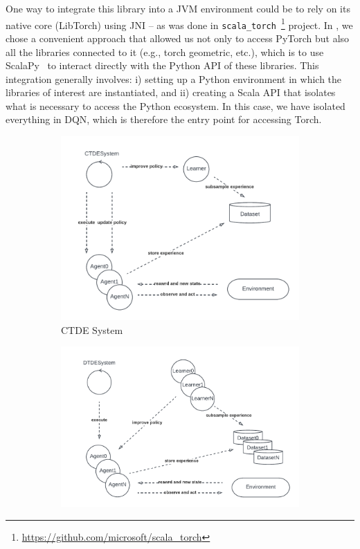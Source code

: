%
One way to integrate this library into a JVM environment could be 
 to rely on its native core (LibTorch) using JNI -- 
 as was done in \texttt{scala\_torch}~\footnote{\url{https://github.com/microsoft/scala_torch}} project. 
 In \scarlib{}, we chose a convenient approach 
 that allowed us not only to access PyTorch 
 but also all the libraries connected to it 
 (e.g., torch geometric, etc.), 
 which is to use ScalaPy~\cite{Laddad2020}  to interact directly with the Python API 
 of these libraries.
%
This integration generally involves:
i) setting up a Python environment in which the libraries of interest are instantiated, and
ii) creating a Scala API that isolates what is necessary to access the Python ecosystem.
In this case, we have isolated everything in DQN, which is therefore the entry point for accessing Torch.
\begin{figure}[t]
    \centering
    \begin{subfigure}[b]{0.49\textwidth}
        \centering
        \includegraphics[width=\textwidth]{papers/coordination2023/imgs/ctdesystem.pdf}
        \caption{CTDE System}
        \label{fig:ctde}
    \end{subfigure}
    \begin{subfigure}[b]{0.49\textwidth}
        \centering
        \includegraphics[width=\textwidth]{papers/coordination2023/imgs/DTDE.pdf}

\end{subfigure}
\end{figure}
